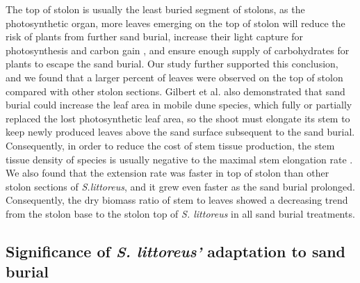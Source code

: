 \documentclass[]{interact}
\theoremstyle{plain}%
\theoremstyle{definition}
\theoremstyle{remark}
\begin{document}
The top of stolon is usually the least buried segment of stolons, as the photosynthetic organ, more leaves emerging on the top of stolon will reduce the risk of plants from further sand burial, increase their light capture for photosynthesis and carbon gain \citep{yuanEffectsSandAccretion1993, shiEffectsSandBurial2004, brownMechanismsSurvivingBurial2018}, and ensure enough supply of carbohydrates for plants to escape the sand burial. Our study further supported this conclusion, and we found that a larger percent of leaves were observed on the top of stolon compared with other stolon sections. Gilbert et al. \citeyear{gilbertGrowthResponsesCoastal2008} also demonstrated that sand burial could increase the leaf area in mobile dune species, which fully or partially replaced the lost photosynthetic leaf area, so the shoot must elongate its stem to keep newly produced leaves above the sand surface subsequent to the sand burial. Consequently, in order to reduce the cost of stem tissue production, the stem tissue density of species is usually negative to the maximal stem elongation rate \citep{frosiniGlobalChangeResponse2012}. We also found that the extension rate was faster in top of stolon than other stolon sections of \textit{S.littoreus}, and it grew even faster as the sand burial prolonged. Consequently, the dry biomass ratio of stem to leaves showed a decreasing trend from the stolon base to the stolon top of \textit{S. littoreus} in all sand burial treatments. 


\subsection{Significance of \textit{\textit{S. littoreus}'} adaptation to sand burial}
\end{document}
